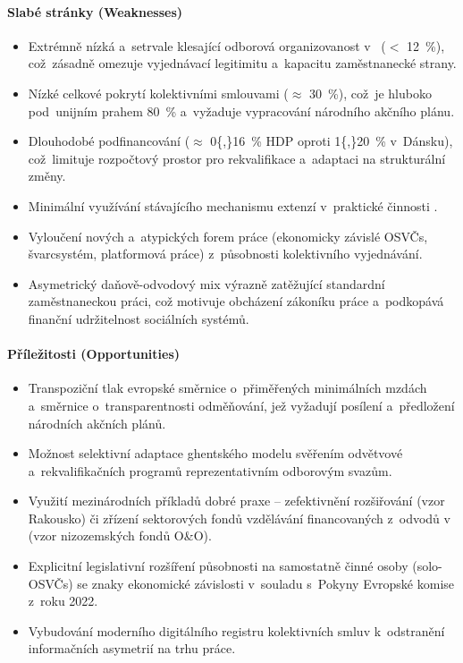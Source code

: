 \paragraph{Slabé stránky (Weaknesses)}\label{par:swot_w}
\begin{itemize}[noitemsep]
	\item Extrémně nízká a~setrvale klesající odborová organizovanost v~ ($<$ \SI{12}{\percent}), což~zásadně omezuje vyjednávací legitimitu a~kapacitu zaměstnanecké strany.
	\item Nízké celkové pokrytí kolektivními smlouvami ($\approx$ \SI{30}{\percent}), což~je hluboko pod~unijním prahem \SI{80}{\percent} a~vyžaduje vypracování národního akčního plánu.\par
	\item Dlouhodobé podfinancování  ($\approx$ \SI{0{,}16}{\percent} \acs{HDP} oproti \SI{1{,}20}{\percent} v~Dánsku), což~limituje rozpočtový prostor pro rekvalifikace a~adaptaci na strukturální změny.
	\item Minimální využívání stávajícího mechanismu extenzí  v~praktické činnosti .
	\item Vyloučení nových a~atypických forem práce (ekonomicky závislé \acp{OSVČ}, švarcsystém, platformová práce) z~působnosti kolektivního vyjednávání.
	\item Asymetrický daňově-odvodový mix výrazně zatěžující standardní zaměstnaneckou práci, což motivuje obcházení zákoníku práce a~podkopává finanční udržitelnost sociálních systémů.
\end{itemize}

\paragraph{Příležitosti (Opportunities)}\label{par:swot_o}
\begin{itemize}[noitemsep]
	\item Transpoziční tlak evropské směrnice o~přiměřených minimálních mzdách a~směrnice o~transparentnosti odměňování, jež vyžadují posílení  a~předložení národních akčních plánů.
	\item Možnost selektivní adaptace ghentského modelu svěřením odvětvové  a~rekvalifikačních programů reprezentativním odborovým svazům.
	\item Využití mezinárodních příkladů dobré praxe – zefektivnění rozšiřování  (vzor Rakousko) či zřízení sektorových fondů vzdělávání financovaných z~odvodů v~ (vzor nizozemských fondů O\&O).
	\item Explicitní legislativní rozšíření působnosti  na samostatně činné osoby (solo-\acp{OSVČ}) se znaky ekonomické závislosti v~souladu s~Pokyny Evropské komise z~roku \SI{2022}{\rok}.\par
	\item Vybudování moderního digitálního registru kolektivních smluv k~odstranění informačních asymetrií na trhu práce.
\end{itemize}

